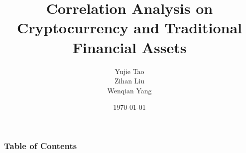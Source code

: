 \documentclass{beamer}
\title{Correlation Analysis on Cryptocurrency and Traditional Financial Assets}
\author{Yujie Tao
\\Zihan Liu
\\Wenqian Yang}
\institute{IT Skills for Research}
\date{\today}
\begin{document}
\frame{\titlepage}

\begin{frame}
\frametitle{Table of Contents}
\tableofcontents
\end{frame}






% 


% 


% 
\end{document}
